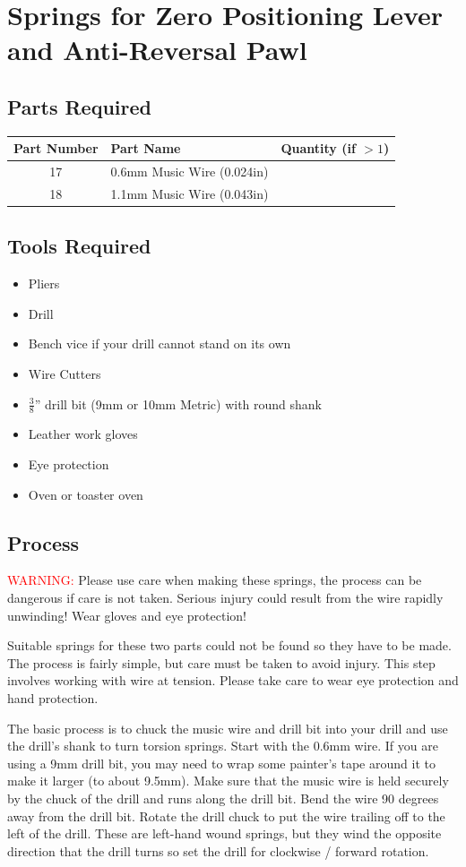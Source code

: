 \documentclass[openany]{book}
\begin{document}
\chapter{Springs for Zero Positioning Lever and Anti-Reversal Pawl}
\section{Parts Required}
\begin{table}[!ht]
	\centering
	\begin{tabular}{clc}
		Part Number & Part Name & Quantity (if $>1$) \\ \hline
		17 & 0.6mm Music Wire (0.024in) & \\
		18 & 1.1mm Music Wire (0.043in) & 
	\end{tabular}
\end{table}



\section{Tools Required}
\begin{itemize}
	\item Pliers
	\item Drill
	\item Bench vice if your drill cannot stand on its own
	\item Wire Cutters
	\item $\frac{3}{8}$'' drill bit (9mm or 10mm Metric) with round shank
	\item Leather work gloves
	\item Eye protection
	\item Oven or toaster oven
\end{itemize}

\section{Process}
\textcolor{red}{WARNING:} Please use care when making these springs, the process can be dangerous if care is not taken. Serious injury could result from the wire rapidly unwinding! Wear gloves and eye protection!


Suitable springs for these two parts could not be found so they have to be made. The process is fairly simple, but care must be taken to avoid injury. This step involves working with wire at tension. Please take care to wear eye protection and hand protection.

The basic process is to chuck the music wire and drill bit into your drill and use the drill’s shank to turn torsion springs. Start with the 0.6mm wire. If you are using a 9mm drill bit, you may need to wrap some painter’s tape around it to make it larger (to about 9.5mm). Make sure that the music wire is held securely by the chuck of the drill and runs along the drill bit. Bend the wire 90 degrees away from the drill bit. Rotate the drill chuck to put the wire trailing off to the left of the drill. These are left-hand wound springs, but they wind the opposite direction that the drill turns so set the drill for clockwise / forward rotation.
\end{document}
